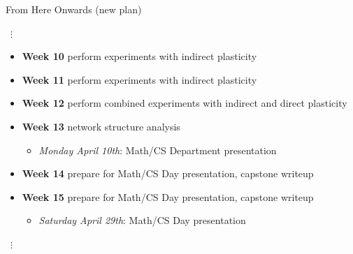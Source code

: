 \begin{frame}{From Here Onwards (new plan)}
\begin{center}
{\centering ~$\bm{\vdots}$~}
\end{center}
\begin{itemize}
 \item \textbf{Week 10} perform experiments with indirect plasticity
  \item \textbf{Week 11} perform experiments with indirect plasticity
  \item \textbf{Week 12} perform combined experiments with indirect and direct plasticity
  \item \textbf{Week 13} network structure analysis
  \begin{itemize}
    \item \textit{Monday April 10th}: Math/CS Department presentation
  \end{itemize}
  \item \textbf{Week 14} prepare for Math/CS Day presentation, capstone writeup
  \item \textbf{Week 15} prepare for Math/CS Day presentation, capstone writeup
  \begin{itemize}
  	\item \textit{Saturday April 29th}: Math/CS Day presentation
  \end{itemize}
 \end{itemize}
\vspace{-1ex}
\begin{center}
{\centering ~$\bm{\vdots}$~}
\end{center}
\end{frame}